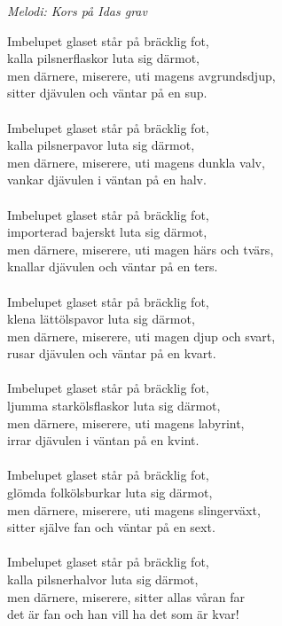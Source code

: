 {\footnotesize\textit{Melodi: Kors på Idas grav}}\par
\vspace{10pt}
Imbelupet glaset står på bräcklig fot,\\
kalla pilsnerflaskor luta sig därmot,\\
men därnere, miserere, uti magens avgrundsdjup,\\
sitter djävulen och väntar på en sup.\\
\\
Imbelupet glaset står på bräcklig fot,\\
kalla pilsnerpavor luta sig därmot,\\
men därnere, miserere, uti magens dunkla valv,\\
vankar djävulen i väntan på en halv.\\
\\
Imbelupet glaset står på bräcklig fot,\\
importerad bajerskt luta sig därmot,\\
men därnere, miserere, uti magen härs och tvärs,\\
knallar djävulen och väntar på en ters.\\
\\
Imbelupet glaset står på bräcklig fot,\\
klena lättölspavor luta sig därmot,\\
men därnere, miserere, uti magen djup och svart,\\
rusar djävulen och väntar på en kvart.\\
\\
Imbelupet glaset står på bräcklig fot,\\
ljumma starkölsflaskor luta sig därmot,\\
men därnere, miserere, uti magens labyrint,\\
irrar djävulen i väntan på en kvint.\\
\\
Imbelupet glaset står på bräcklig fot,\\
glömda folkölsburkar luta sig därmot,\\
men därnere, miserere, uti magens slingerväxt,\\
sitter själve fan och väntar på en sext.\\
\\
Imbelupet glaset står på bräcklig fot,\\
kalla pilsnerhalvor luta sig därmot,\\
men därnere, miserere, sitter allas våran far\\
det är fan och han vill ha det som är kvar!
